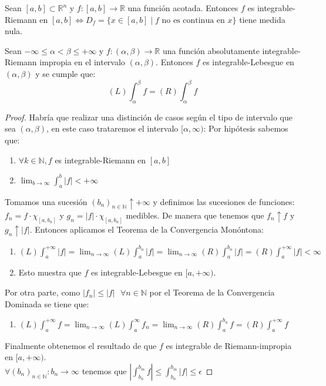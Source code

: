\begin{teorema}
    Sean $[a, b]\subset \mathbb{R}^n$ y $f: [a, b] \to \mathbb{R}$ una función acotada. Entonces $f$ es integrable-Riemann en $[a, b] \iff D_f = \{ x \in [a, b] \mid f \text{ no es continua en } x \}$ tiene medida nula.
\end{teorema}

\begin{teorema}
    Sean $-\infty \leq \alpha < \beta \leq +\infty$ y $f: (\alpha, \beta) \to \mathbb{R}$ una función absolutamente integrable-Riemann impropia en el intervalo $(\alpha, \beta)$. Entonces $f$ es integrable-Lebesgue en $(\alpha, \beta)$ y se cumple que:
    $$ (L) \int_{\alpha}^{\beta}f = (R)\int_{\alpha}^{\beta}f $$
\end{teorema}
\begin{proof}
    Habría que realizar una distinción de casos según el tipo de intervalo que sea $(\alpha, \beta)$, en este caso trataremos el intervalo $[\alpha, \infty)$:
    Por hipótesis sabemos que:
    \begin{enumerate}
        \item $\forall k \in \mathbb{N}, f$ es integrable-Riemann en $[a, b]$
        \item $\lim_{b \to \infty} \int_{a}^{b}|f| < +\infty$
    \end{enumerate}
    Tomamos una sucesión $(b_n)_{n \in \mathbb{N}} \uparrow +\infty$ y definimos las sucesiones de funciones: $f_n = f\cdot\chi_{[a, b_n]}$ y $g_n = |f|\cdot\chi_{[a, b_n]}$ medibles. De manera que tenemos que $f_n \uparrow f$ y $g_n \uparrow |f|$. Entonces aplicamos el Teorema de la Convergencia Monóntona:
    \begin{enumerate}
        \item $(L)\int_{a}^{+\infty}|f| = \lim_{n \to \infty}(L)\int_{a}^{b_n}|f| = \lim_{n \to \infty}(R)\int_{a}^{b_n}|f| = (R)\int_{a}^{+\infty}|f| < \infty$
        \item Esto muestra que $f$ es integrable-Lebesgue en $[a, +\infty)$.
    \end{enumerate}
    Por otra parte, como $|f_n| \leq |f| \text{  }\forall n \in \mathbb{N}$ por el Teorema de la Convergencia Dominada se tiene que:
    \begin{enumerate}
        \item $(L)\int_{a}^{+\infty}f = \lim_{n \to \infty}(L)\int_{a}^{\infty}f_n = \lim_{n \to \infty}(R)\int_{a}^{b_n}f = (R)\int_{a}^{+\infty}f$
    \end{enumerate}
    Finalmente obtenemos el resultado de que $f$ es integrable de Riemann-impropia en $[a, +\infty)$.
    \\$\forall (b_n)_{n \in \mathbb{N}} : b_n \to \infty$ tenemos que $|\int_{b_n}^{b_m}f| \leq \int_{b_n}^{b_m}|f| \leq \epsilon$
\end{proof}
